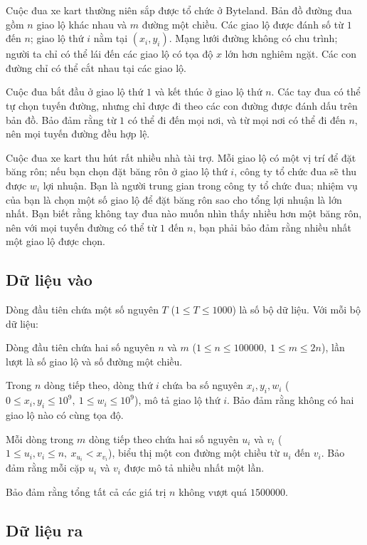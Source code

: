 \documentclass[11pt]{article}
\begin{document}
Cuộc đua xe kart thường niên sắp được tổ chức ở Byteland. Bản đồ đường đua
gồm \(n\) giao lộ khác nhau và \(m\) đường một chiều. Các giao lộ được đánh
số từ \(1\) đến \(n\); giao lộ thứ \(i\) nằm tại \((x_i,y_i)\). Mạng lưới
đường không có chu trình; người ta chỉ có thể lái đến các giao lộ có tọa độ
\(x\) lớn hơn nghiêm ngặt. Các con đường chỉ có thể cắt nhau tại các giao lộ.

Cuộc đua bắt đầu ở giao lộ thứ \(1\) và kết thúc ở giao lộ thứ \(n\). Các tay
đua có thể tự chọn tuyến đường, nhưng chỉ được đi theo các con đường được
đánh dấu trên bản đồ. Bảo đảm rằng từ \(1\) có thể đi đến mọi nơi, và từ mọi
nơi có thể đi đến \(n\), nên mọi tuyến đường đều hợp lệ.

Cuộc đua xe kart thu hút rất nhiều nhà tài trợ. Mỗi giao lộ có một vị trí để
đặt băng rôn; nếu bạn chọn đặt băng rôn ở giao lộ thứ \(i\), công ty tổ chức
đua sẽ thu được \(w_i\) lợi nhuận. Bạn là người trung gian trong công ty tổ
chức đua; nhiệm vụ của bạn là chọn một số giao lộ để đặt băng rôn sao cho
tổng lợi nhuận là lớn nhất. Bạn biết rằng không tay đua nào muốn nhìn thấy
nhiều hơn một băng rôn, nên với mọi tuyến đường có thể từ \(1\) đến \(n\),
bạn phải bảo đảm rằng nhiều nhất một giao lộ được chọn.

\subsection*{Dữ liệu vào}

Dòng đầu tiên chứa một số nguyên \(T\) (\(1\le T\le 1000\)) là số bộ dữ liệu.
Với mỗi bộ dữ liệu:

Dòng đầu tiên chứa hai số nguyên \(n\) và \(m\)
(\(1\le n\le 100000,\ 1\le m\le 2n\)), lần lượt là số giao lộ và số đường một
chiều.

Trong \(n\) dòng tiếp theo, dòng thứ \(i\) chứa ba số nguyên \(x_i,y_i,w_i\)
(\(0\le x_i,y_i\le 10^9,\ 1\le w_i\le 10^9\)), mô tả giao lộ thứ \(i\). Bảo
đảm rằng không có hai giao lộ nào có cùng tọa độ.

Mỗi dòng trong \(m\) dòng tiếp theo chứa hai số nguyên \(u_i\) và \(v_i\)
(\(1\le u_i,v_i\le n,\ x_{u_i}<x_{v_i}\)), biểu thị một con đường một chiều
từ \(u_i\) đến \(v_i\). Bảo đảm rằng mỗi cặp \(u_i\) và \(v_i\) được mô tả
nhiều nhất một lần.

Bảo đảm rằng tổng tất cả các giá trị \(n\) không vượt quá \(1500000\).

\subsection*{Dữ liệu ra}
\end{document}
